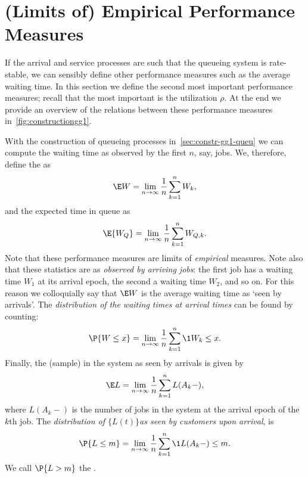 \section{(Limits of) Empirical Performance Measures}
\label{sec:limits-of-emperical}




If the arrival and service processes are such that the queueing system is rate-stable, we can sensibly define other performance measures such as the average waiting time.
In this section we define the second most important performance measures; recall that the most important is the utilization $\rho$.
At the end we provide an overview of the relations between these performance measures in~\cref{fig:constructiongg1}.


With the construction of queueing processes in~\cref{sec:constr-gg1-queu} we can compute the waiting time as observed by the first $n$, say, jobs.
We, therefore, define the  as
\begin{equation}\label{eq:49}
  \E W = \lim_{n\to\infty} \frac 1n\sum_{k=1}^n W_k,
\end{equation}
and the expected time in queue as
\begin{equation}\label{eq:50}
  \E{W_Q} = \lim_{n\to\infty} \frac 1 n\sum_{k=1}^n W_{Q,k}.
\end{equation}
Note that these performance measures are limits of \emph{empirical} measures.
Note also that these statistics are as \emph{observed by arriving jobs}: the first job has a waiting time $W_1$ at its arrival epoch, the second a waiting time $W_2$, and so on.
For this reason we colloquially say that $\E W$ is the average waiting time as `seen by arrivals'.
The \emph{distribution of the waiting times at arrival times} can be found by counting:
\begin{equation}\label{eq:48}
  \P{W \leq x}  = \lim_{n\to\infty} \frac 1n\sum_{k=1}^n \1{W_k\leq x}.
\end{equation}
Finally, the (sample)  in the system as seen by arrivals is given by
\begin{equation}\label{eq:EQ}
\E L =  \lim_{n\to\infty}\frac 1 n \sum_{k=1}^n L(A_k-),
\end{equation}
where $L(A_k-)$ is the number of jobs in the system at the arrival epoch of the $k$th job.
The \emph{distribution of $\{L(t)\}$as seen by customers upon arrival}, is
\begin{equation}\label{eq:Qm}
\P{L\leq m} = \lim_{n\to\infty} \frac 1 n \sum_{k=1}^n \1{L(A_k-) \leq m}.
\end{equation}
We call $\P{L > m}$ the .



